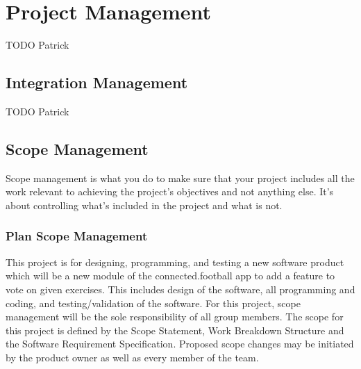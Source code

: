 \section{Project Management}
\label{sec:project_management}

TODO Patrick



\subsection{Integration Management}
\label{ssec:integration_management}

TODO Patrick



\subsection{Scope Management}
\label{ssec:scope_management}

Scope management is what you do to make sure that your project includes all the work relevant to achieving the project’s objectives and not anything else. It’s about controlling what’s included in the project and what is not.

\subsubsection{Plan Scope Management}
\label{sssec:plan_scope_management}

This project is for designing, programming, and testing a new software product which will be a new module of the connected.football app to add a feature to vote on given exercises. This includes design of the software, all programming and coding, and testing/validation of the software.
\newline
For this project, scope management will be the sole responsibility of all group members. The scope for this project is defined by the Scope Statement, Work Breakdown Structure and the Software Requirement Specification. Proposed scope changes may be initiated by the product owner as well as every member of the team.

